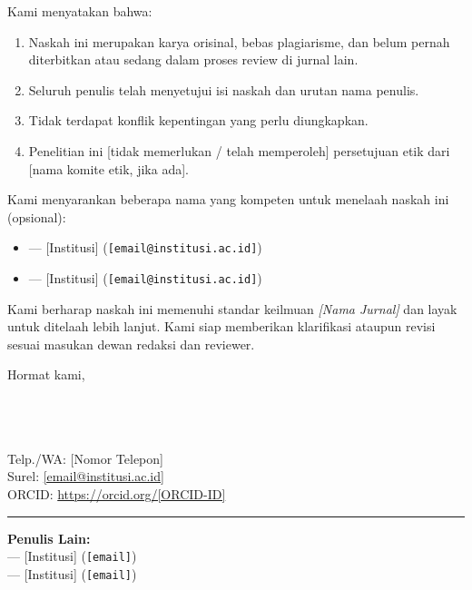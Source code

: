 \documentclass[12pt,a4paper]{article}
\begin{document}
Kami menyatakan bahwa:
\begin{enumerate}
  \item Naskah ini merupakan karya orisinal, bebas plagiarisme, dan belum pernah
        diterbitkan atau sedang dalam proses review di jurnal lain.
  \item Seluruh penulis telah menyetujui isi naskah dan urutan nama penulis.
  \item Tidak terdapat konflik kepentingan yang perlu diungkapkan.
  \item Penelitian ini [tidak memerlukan / telah memperoleh] persetujuan etik
        dari [nama komite etik, jika ada].
\end{enumerate}

\bigskip

Kami menyarankan beberapa nama yang kompeten untuk menelaah naskah ini (opsional):
\begin{itemize}
  \item [Nama Reviewer 1] — [Institusi] (\texttt{[email@institusi.ac.id]})
  \item [Nama Reviewer 2] — [Institusi] (\texttt{[email@institusi.ac.id]})
\end{itemize}

\bigskip

Kami berharap naskah ini memenuhi standar keilmuan \textit{[Nama Jurnal]} dan layak untuk
ditelaah lebih lanjut. Kami siap memberikan klarifikasi ataupun revisi sesuai masukan
dewan redaksi dan reviewer.

\bigskip

Hormat kami,

\vspace{2em}

\\
[Jabatan / Program Studi]\\
[Nama Institusi]\\
Telp./WA: [Nomor Telepon]\\
Surel: \href{mailto:[email@institusi.ac.id]}{[email@institusi.ac.id]}\\
ORCID: \href{https://orcid.org/[ORCID-ID]}{https://orcid.org/[ORCID-ID]}

\bigskip
\hrule
\medskip
{\footnotesize
\textbf{Penulis Lain:}\\
[Nama Penulis 2] — [Institusi] (\texttt{[email]})\\
[Nama Penulis 3] — [Institusi] (\texttt{[email]})
}
\end{document}

